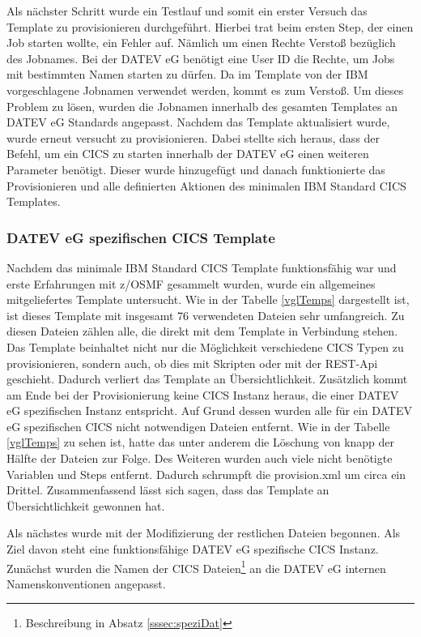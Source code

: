 Als nächster Schritt wurde ein Testlauf und somit ein erster Versuch das Template zu provisionieren durchgeführt.
Hierbei trat beim ersten Step, der einen Job starten wollte, ein Fehler auf.
Nämlich um einen Rechte Verstoß bezüglich des Jobnames.
Bei der DATEV eG benötigt eine User ID die Rechte, um Jobs mit bestimmten Namen starten zu dürfen.
Da im Template von der IBM vorgeschlagene Jobnamen verwendet werden, kommt es zum Verstoß.
Um dieses Problem zu lösen, wurden die Jobnamen innerhalb des gesamten Templates an DATEV eG Standards angepasst.
Nachdem das Template aktualisiert wurde, wurde erneut versucht zu provisionieren.
Dabei stellte sich heraus, dass der Befehl, um ein CICS zu starten innerhalb der DATEV eG einen weiteren Parameter benötigt.
Dieser wurde hinzugefügt und danach funktionierte das Provisionieren und alle definierten Aktionen des minimalen IBM Standard CICS Templates.

\subsubsection{DATEV eG spezifischen CICS Template}\label{sssec:datevcics}
Nachdem das minimale IBM Standard CICS Template funktionsfähig war und erste Erfahrungen mit z/OSMF gesammelt wurden, wurde ein allgemeines mitgeliefertes Template untersucht.
Wie in der Tabelle \ref{vglTemps} dargestellt ist, ist dieses Template mit insgesamt 76 verwendeten Dateien sehr umfangreich.
Zu diesen Dateien zählen alle, die direkt mit dem Template in Verbindung stehen.
Das Template beinhaltet nicht nur die Möglichkeit verschiedene CICS Typen zu provisionieren, sondern auch, ob dies mit Skripten oder mit der REST-Api geschieht.
Dadurch verliert das Template an Übersichtlichkeit.
Zusätzlich kommt am Ende bei der Provisionierung keine CICS Instanz heraus, die einer DATEV eG spezifischen Instanz entspricht.
Auf Grund dessen wurden alle für ein DATEV eG spezifischen CICS nicht notwendigen Dateien entfernt.
Wie in der Tabelle \ref{vglTemps} zu sehen ist, hatte das unter anderem die Löschung von knapp der Hälfte der Dateien zur Folge.
Des Weiteren wurden auch viele nicht benötigte Variablen und Steps entfernt.
Dadurch schrumpft die provision.xml um circa ein Drittel.
Zusammenfassend lässt sich sagen, dass das Template an Übersichtlichkeit gewonnen hat.

Als nächstes wurde mit der Modifizierung der restlichen Dateien begonnen.
Als Ziel davon steht eine funktionsfähige DATEV eG spezifische CICS Instanz.
Zunächst wurden die Namen der CICS Dateien\footnote{Beschreibung in Absatz \ref{sssec:speziDat}} an die DATEV eG internen Namenskonventionen angepasst.


